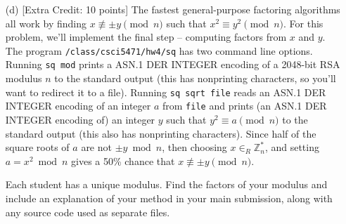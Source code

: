 \documentclass[11pt]{article}
\begin{document}
\begin{itemize}
\item[(d)] [Extra Credit: 10 points] The fastest general-purpose
  factoring algorithms all work by finding $x \not\equiv \pm y \pmod n$
  such that $x^2 \equiv y^2 \pmod n$.  For this problem, we'll
  implement the final step -- computing factors from $x$ and $y$.  The
  program \verb#/class/csci5471/hw4/sq#  has two command line
  options.  Running \verb#sq mod# prints a ASN.1 DER INTEGER encoding
  of a 2048-bit RSA modulus $n$ to the standard output (this has
  nonprinting characters, so you'll want to redirect it to a file).
  Running \verb#sq sqrt file# reads an ASN.1 DER INTEGER encoding of
  an integer $a$ from \verb#file# and prints (an ASN.1 DER INTEGER
  encoding of) an integer $y$ such that $y^2 \equiv a \pmod n$ to the
  standard output (this also has nonprinting characters).  Since
  half of the square roots of $a$ are not $\pm y \bmod n$, then
  choosing $x \in_R \mathbb{Z}_n^*$, and setting $a = x^2 \bmod n$
  gives a 50\% chance that $x \not\equiv \pm y \pmod n$.

  Each student has a unique modulus.  Find the factors of your modulus
  and include an explanation of your method in your main submission,
  along with any source code used as separate files.
\end{itemize}
\end{document}

